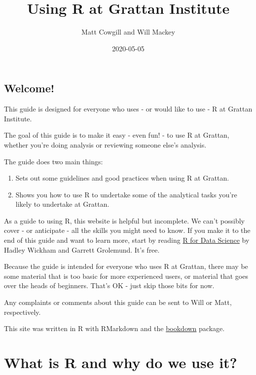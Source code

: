 \documentclass[
]{book}
\title{Using R at Grattan Institute}
\author{Matt Cowgill and Will Mackey}
\date{2020-05-05}
\providecommand{\tightlist}{%
  \setlength{\itemsep}{0pt}\setlength{\parskip}{0pt}}
\begin{document}
\maketitle

{
\setcounter{tocdepth}{1}
\tableofcontents
}
\hypertarget{welcome}{%
\chapter*{Welcome!}\label{welcome}}

This guide is designed for everyone who uses - or would like to use - R at Grattan Institute.

The goal of this guide is to make it easy - even fun! - to use R at Grattan, whether you're doing analysis or reviewing someone else's analysis.

The guide does two main things:

\begin{enumerate}
\def\labelenumi{\arabic{enumi}.}
\tightlist
\item
  Sets out some guidelines and good practices when using R at Grattan.
\item
  Shows you how to use R to undertake some of the analytical tasks you're likely to undertake at Grattan.
\end{enumerate}

As a guide to using R, this website is helpful but incomplete. We can't possibly cover - or anticipate - all the skills you might need to know. If you make it to the end of this guide and want to learn more, start by reading \href{https://r4ds.had.co.nz}{R for Data Science} by Hadley Wickham and Garrett Grolemund. It's free.

Because the guide is intended for everyone who uses R at Grattan, there may be some material that is too basic for more experienced users, or material that goes over the heads of beginners. That's OK - just skip those bits for now.

Any complaints or comments about this guide can be sent to Will or Matt, respectively.

This site was written in R with RMarkdown and the \href{https://bookdown.org}{bookdown} package.

\hypertarget{part-what-is-r-and-why-do-we-use-it}{%
\part{What is R and why do we use it?}\label{part-what-is-r-and-why-do-we-use-it}}
\end{document}
